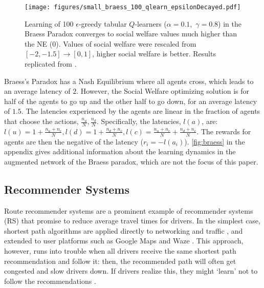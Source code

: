 \begin{figure}[!ht]
\centering
\texttt{[image: figures/small\_braess\_100\_qlearn\_epsilonDecayed.pdf]} \\
\caption{Learning of 100 $\epsilon$-greedy tabular $Q$-learners \mbox{($\alpha=0.1$, $\gamma=0.8$)} in the Braess Paradox converges to social welfare values much higher than the NE (0). Values of social welfare were rescaled from \mbox{$[-2,-1.5]\rightarrow[0,1]$}, higher social welfare is better. Results replicated from \cite{carissimo2024counter}.}
\label{fig:braess_network_learning}
\end{figure}

Braess's Paradox has a Nash Equilibrium where all agents cross, which leads to an average latency of $2$. However, the Social Welfare optimizing solution is for half of the agents to go up and the other half to go down, for an average latency of $1.5$. The latencies experienced by the agents are linear in the fraction of agents that choose the actions, $\frac{n_{u}}{N}, \frac{n_{d}}{N}$. Specifically, the latencies, $l(a)$, are: $l(u) = 1 + \frac{n_{u}+n_{c}}{N}, l(d) = 1 + \frac{n_{d}+n_{c}}{N}, l(c) = \frac{n_{u}+n_{c}}{N} + \frac{n_{d}+n_{c}}{N}$. The rewards for agents are then the negative of the latency ($r_i=-l(a_i)$). \autoref{fig:braess} in the appendix gives additional information about the learning dynamics in the augmented network of the Braess paradox, which are not the focus of this paper.


\subsection{Recommender Systems}

Route recommender systems are a prominent example of recommender systems (RS) that promise to reduce average travel times for drivers. In the simplest case, shortest path algorithms are applied directly to networking and traffic \cite{abolhasan2004review, zeng2009finding}, and extended to user platforms such as Google Maps and Waze \cite{luxen2011real, wang2014r3, dai2015personalized}. This approach, however, runs into trouble when all drivers receive the same shortest path recommendation and follow it: then, the recommended path will often get congested and slow drivers down. If drivers realize this, they might `learn' not to follow the recommendations \cite{helbing2002volatile}. 


